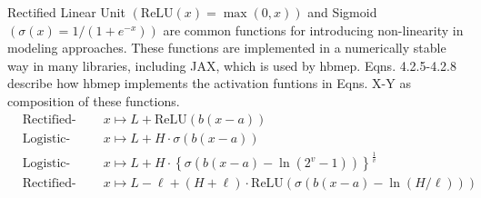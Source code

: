 \documentclass[a4paper,12pt]{article}
\begin{document}
    Rectified Linear Unit $\left(\text{ReLU}\left(x\right) = \max\left(0, x\right)\right)$ and Sigmoid $\left(\sigma\left(x\right) = 1 / \left(1 + e^{-x}\right)\right)$ are common functions for introducing non-linearity in modeling approaches. These functions are implemented in a numerically stable way in many libraries, including JAX, which is used by hbmep. Eqns. 4.2.5-4.2.8 describe how hbmep implements the activation funtions in Eqns. X-Y as composition of these functions.
    \begin{align*}
        &\text{Rectified-linear} &\;\;&x \mapsto L + \text{ReLU}\left(b\left(x - a\right)\right) \tag{5.1.8}\\
        &\text{Logistic-4} &\;\;&x \mapsto L + H\cdot\sigma\left(b\left(x - a\right)\right)  \tag{5.1.9}\\
        &\text{Logistic-5} &\;\;&x \mapsto L + H\cdot \left\{\sigma\left(b\left(x - a\right) - \ln\left(2^v - 1\right)\right)\right\}^{\frac1v} \tag{5.1.10}\\
        &\text{Rectified-logistic} &\;\;&x \mapsto L - \ell + \left(H + \ell\right)\cdot\text{ReLU}\left(\sigma\left(b\left(x - a\right) - \ln\left(H / \ell\right)\right)\right)\tag{5.1.11}\\
    \end{align*}
\end{document}
